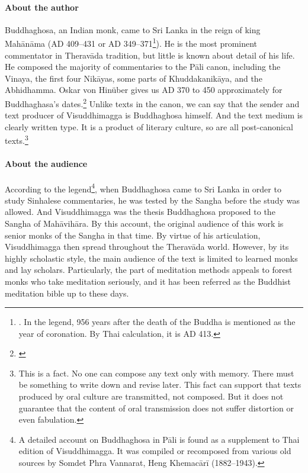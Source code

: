 \paragraph*{About the author} Buddhaghosa, an Indian monk, came to Sri Lanka in the reign of king Mah\=an\=ama (AD 409--431 or AD 349--371\footnote{\citealp[p.~102]{hinuber:literature}. In the legend, 956 years after the death of the Buddha is mentioned as the year of coronation. By Thai calculation, it is AD 413.}). He is the most prominent commentator in Therav\=ada tradition, but little is known about detail of his life. He composed the majority of commentaries to the P\=ali canon, including the Vinaya, the first four Nik\=ayas, some parts of Khuddakanik\=aya, and the Abhidhamma. Oskar von Hin\"uber gives us AD 370 to 450 approximately for Buddhaghasa's dates.\footnote{\citealp[p.~103]{hinuber:literature}} Unlike texts in the canon, we can say that the sender and text producer of Visuddhimagga is Buddhaghosa himself. And the text medium is clearly written type. It is a product of literary culture, so are all post-canonical texts.\footnote{This is a fact. No one can compose any text only with memory. There must be something to write down and revise later. This fact can support that texts produced by oral culture are transmitted, not composed. But it does not guarantee that the content of oral transmission does not suffer distortion or even fabulation.}

\paragraph*{About the audience} According to the legend\footnote{A detailed account on Buddhaghosa in P\=ali is found as a supplement to Thai edition of Visuddhimagga. It was compiled or recomposed from various old sources by Somdet Phra Vannarat, Heng Khemac\=ar\=i (1882--1943).}, when Buddhagh\-osa came to Sri Lanka in order to study Sinhalese commentaries, he was tested by the Sangha before the study was allowed. And Visuddhimagga was the thesis Buddhaghosa proposed to the Sangha of Mah\=avih\=ara. By this account, the original audience of this work is senior monks of the Sangha in that time. By virtue of his articulation, Visuddhimagga then spread throughout the Therav\=ada world. However, by its highly scholastic style, the main audience of the text is limited to learned monks and lay scholars. Particularly, the part of meditation methods appeals to forest monks who take meditation seriously, and it has been referred as the Buddhist meditation bible up to these days.
 
